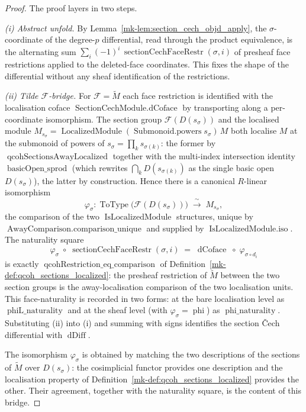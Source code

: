 \begin{proof}
  The proof layers in two steps.

  \emph{(i) Abstract unfold.} By Lemma~\ref{mk-lem:section_cech_objd_apply}, the
  \(\sigma\)-coordinate of the degree-\(p\) differential, read through the product
  equivalence, is the alternating sum
  \(\sum_{i} (-1)^i\, \operatorname{sectionCechFaceRestr}(\sigma, i)\) of presheaf face
  restrictions applied to the deleted-face coordinates. This fixes the shape of the
  differential without any sheaf identification of the restrictions.

  \emph{(ii) Tilde \(\mathcal{F}\)-bridge.} For \(\mathcal{F} = \widetilde{M}\) each
  face restriction is identified with the localisation coface
  \(\operatorname{SectionCechModule.dCoface}\) by transporting along a per-coordinate
  isomorphism. The section group
  \(\mathcal{F}(D(s_\sigma))\) and the localised module
  \(M_{s_\sigma} = \operatorname{LocalizedModule}(\operatorname{Submonoid.powers}
  s_\sigma)\, M\) both localise \(M\) at the submonoid of powers of
  \(s_\sigma = \prod_k s_{\sigma(k)}\): the former by
  \(\operatorname{qcohSectionsAwayLocalized}\) together with the multi-index
  intersection identity \(\operatorname{basicOpen\_sprod}\) (which rewrites
  \(\bigcap_k D(s_{\sigma(k)})\) as the single basic open \(D(s_\sigma)\)), the latter
  by construction. Hence there is a canonical \(R\)-linear isomorphism
  \[
    \varphi_\sigma :
      \operatorname{ToType}\bigl(\mathcal{F}(D(s_\sigma))\bigr)
      \;\xrightarrow{\;\sim\;}\;
      M_{s_\sigma},
  \]
  the comparison of the two \(\operatorname{IsLocalizedModule}\) structures, unique by
  \(\operatorname{AwayComparison.comparison\_unique}\) and supplied by
  \(\operatorname{IsLocalizedModule.iso}\). The naturality square
  \[
    \varphi_\sigma \;\circ\; \operatorname{sectionCechFaceRestr}(\sigma, i)
      \;=\;
      \operatorname{dCoface} \;\circ\; \varphi_{\sigma \circ d_i}
  \]
  is exactly \(\operatorname{qcohRestriction\_eq\_comparison}\) of
  Definition~\ref{mk-def:qcoh_sections_localized}: the presheaf restriction of
  \(\widetilde{M}\) between the two section groups is the away-localisation comparison
  of the two localisation units. This face-naturality is recorded in two forms: at the
  bare localisation level as \(\operatorname{phiL\_naturality}\) and at the sheaf level
  (with \(\varphi_\sigma = \operatorname{phi}\)) as \(\operatorname{phi\_naturality}\).
  Substituting (ii) into (i) and summing with signs
  identifies the section {\v C}ech differential with \(\operatorname{dDiff}\).

  The isomorphism \(\varphi_\sigma\) is obtained by matching the two descriptions of
  the sections of \(\widetilde{M}\) over \(D(s_\sigma)\): the cosimplicial functor
  provides one description and the localisation property of
  Definition~\ref{mk-def:qcoh_sections_localized} provides the other. Their agreement,
  together with the naturality square, is the content of this bridge.
\end{proof}

